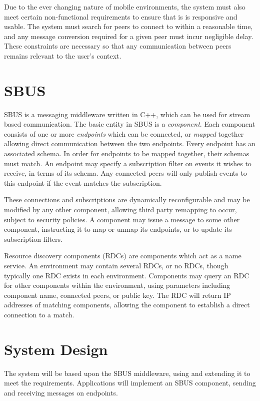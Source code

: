\documentclass[12pt,twoside,notitlepage]{report}
\begin{document}
Due to the ever changing nature of mobile environments, the system must also meet certain non-functional requirements to ensure that is is responsive and usable. 
The system must search for peers to connect to within a reasonable time, and any message conversion required for a given peer must incur negligible delay.
These constraints are necessary so that any communication between peers remains relevant to the user's context.

\section{SBUS}

SBUS \cite{ingram2009reconfigurable} is a messaging middleware written in C++, which can be used for stream based communication. 
The basic entity in SBUS is a {\sl component}. 
Each component consists of one or more {\sl endpoints} which can be connected, or {\sl mapped} together allowing direct communication between the two endpoints. 
Every endpoint has an associated schema. 
In order for endpoints to be mapped together, their schemas must match. 
An endpoint may specify a subscription filter on events it wishes to receive, in terms of its schema. 
Any connected peers will only publish events to this endpoint if the event matches the subscription.

These connections and subscriptions are dynamically reconfigurable and may be modified by any other component, allowing third party remapping to occur, subject to security policies. 
A component may issue a message to some other component, instructing it to map or unmap its endpoints, or to update its subscription filters.

Resource discovery components (RDCs) are components which act as a name service. 
An environment may contain several RDCs, or no RDCs, though typically one RDC exists in each environment.
Components may query an RDC for other components within the environment, using parameters including component name, connected peers, or public key. 
The RDC will return IP addresses of matching components, allowing the component to establish a direct connection to a match.

\section{System Design}

The system will be based upon the SBUS middleware, using and extending it to meet the requirements. 
Applications will implement an SBUS component, sending and receiving messages on endpoints. 
\end{document}
